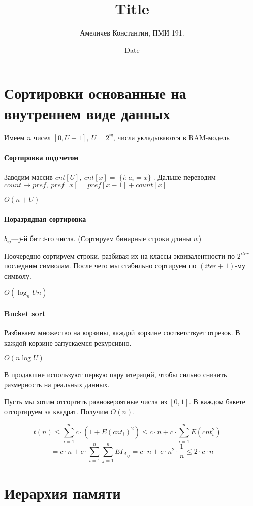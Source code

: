 \documentclass[12pt]{article}
\title{Title}
\author{Амеличев Константин, ПМИ 191.}
\date{Date}
\newcommand{\rangesum}[2]{\displaystyle \sum_{#1}^{#2}}
\begin{document}
\section{Сортировки основанные на внутреннем виде данных}

Имеем $n$ чисел $[0, U - 1],\ U = 2^w$, числа укладываются в RAM-модель

\paragraph{Сортировка подсчетом}

Заводим массив $cnt[U],\ cnt[x] = |\{i : a_i = x\}|$. Дальше переводим $count \rightarrow pref,\ pref[x] = pref[x - 1] + count[x]$

$O(n + U)$

\paragraph{Поразрядная сортировка}

$b_{ij}$---$j$-й бит $i$-го числа. (Сортируем бинарные строки длины $w$)

Поочередно сортируем строки, разбивая их на классы эквивалентности по $2^{iter}$ последним символам. После чего мы стабильно сортируем по $(iter+1)$-му символу. 

$O(\log_n U n)$

\paragraph{Bucket sort}

Разбиваем множество на корзины, каждой корзине соответствует отрезок. В каждой корзине запускаемся рекурсивно. 

$O(n \log U)$

В продакшне используют первую пару итераций, чтобы сильно снизить размерность на реальных данных.

Пусть мы хотим отсортить равновероятные числа из  $[0, 1]$. В каждом бакете отсортируем за квадрат. Получим $O(n)$. 

$$t(n) \le \rangesum{i=1}{n} c \cdot (1 + E (cnt_i)^2) \le c \cdot n + c \cdot \rangesum{i=1}{n} E (cnt_i^2) = $$
$$ = c \cdot n + c \cdot \rangesum{i=1}{n} \rangesum{j=1}{n} E I_{A_{ij}} = c \cdot n + c \cdot n^2 \cdot \frac{1}{n} \le 2 \cdot c \cdot n$$

\section{Иерархия памяти}
\end{document}

